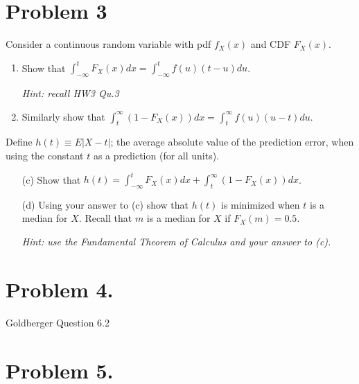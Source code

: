 \documentclass{article}
\newcommand{\1}{\mathbf{1}}
\begin{document}
\section*{Problem 3}
Consider a continuous random variable with pdf $f_X(x)$ and CDF $F_X(x)$.
\begin{enumerate}
    \item Show that $\int_{-\infty}^t F_X(x) dx = \int_{-\infty}^t f(u) (t-u) du$.\par {\it Hint: recall HW3 Qu.3}
    \item Similarly show that $\int_{t}^\infty (1-F_X(x)) dx = \int_{t}^\infty f(u) (u-t) du$.
\end{enumerate}
Define $h(t) \equiv E|X-t|$; the average absolute value of the prediction error, when using the constant $t$ as a prediction (for all units).
\begin{enumerate}
    \item[(c)] Show that $h(t) =  \int_{-\infty}^t F_X(x) dx + \int_t^\infty(1 - F_X(x))dx$.
    \item[(d)] Using your answer to (c) show that $h(t)$ is minimized when $t$ is a median for $X$. Recall that $m$ is a median for $X$ if $F_X(m) = 0.5$.\par
            {\it Hint: use the Fundamental Theorem of Calculus and your answer to (c).}
\end{enumerate}



\newpage
\section*{Problem 4.} Goldberger Question 6.2



\newpage
\section*{Problem 5.} 
\end{document}
